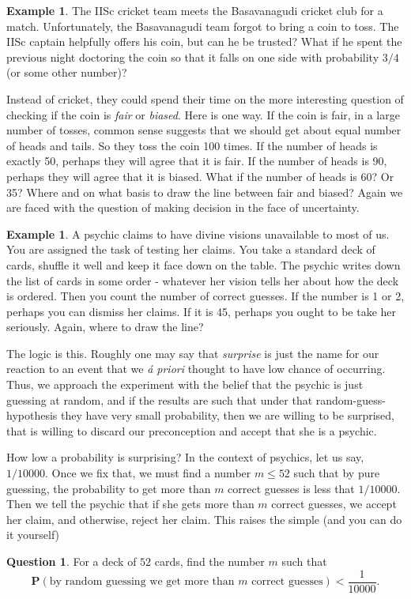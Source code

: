 \documentclass[preprint,  11pt]{amsart}
\theoremstyle{plain} %
\theoremstyle{definition} %
\newtheorem{question}[theorem]{Question}
\newtheorem{example}[theorem]{Example}
\begin{document}
\begin{example} The IISc cricket team meets the Basavanagudi cricket club for a match. Unfortunately, the Basavanagudi team forgot to bring a coin to toss. The IISc captain helpfully offers his coin, but can he be trusted? What if he spent the previous night doctoring the coin so that it falls on one side with probability $3/4$ (or some other number)?

Instead of cricket, they could spend their time on the more interesting question of checking if the coin is {\em fair} or {\em biased}. Here is one way. If the coin is fair, in a large number of tosses, common sense suggests that we should get about equal number of heads and tails. So they  toss the coin 100 times. If the number of heads is exactly 50, perhaps they will agree that it is fair. If the number of heads is 90, perhaps they will agree that it is biased. What if the number of heads is 60? Or 35? Where and on what basis to draw the line between fair and biased? Again we are faced with the question of making decision in the face of uncertainty.
\end{example}

\begin{example} A psychic claims to have divine visions unavailable to most of us. You are assigned the task of testing her claims. You take a standard deck of cards, shuffle it well and keep it face down on the table. The psychic writes down the list of cards in some order - whatever her vision tells her about how the deck is ordered. Then you count the number of correct guesses. If the number is 1 or 2, perhaps you can dismiss her claims. If it is 45, perhaps you ought to be take her seriously. Again, where to draw the line?

The logic is this. Roughly one may say that {\em surprise} is just the name for our reaction to an event that we {\em \'{a} priori} thought to have low chance of occurring. Thus, we approach the experiment with the belief that the psychic is just guessing at random, and if the results are such that under that random-guess-hypothesis they have very small probability, then we are willing to be surprised, that is willing to discard our preconception and accept that she is a psychic.

How low a probability is surprising? In the context of psychics, let us say, $1/10000$. Once we fix that, we must find a number $m\le 52$ such that by pure guessing, the probability to get more than $m$ correct guesses is less that $1/10000$. Then we tell the psychic that if she gets more than $m$ correct guesses, we accept her claim, and otherwise, reject her claim.  This raises the simple (and you can do it yourself)
\begin{question} For a deck of $52$ cards, find the number $m$ such that
$$
\mathbf{P}(\mbox{by random guessing we get more than }m\mbox{ correct guesses})<\frac{1}{10000}.
$$
\end{question}
\end{example}
\end{document}
